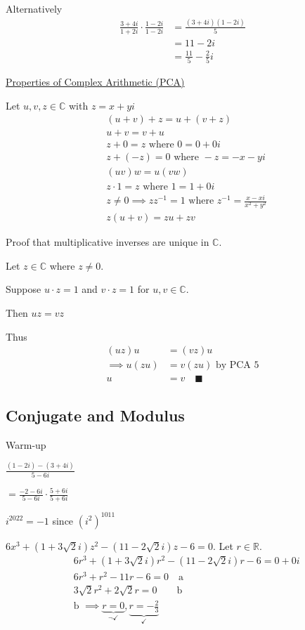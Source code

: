 \documentclass{article}
\begin{document}
Alternatively
\begin{align*}
    \frac{3+4i}{1+2i} \cdot \frac{1-2i}{1-2i} &= \frac{(3+4i)(1-2i)}{5}\\
    &= 11 - 2i\\
    &= \frac{11}{5} - \frac{2}{5}i
\end{align*}

\underline{Properties of Complex Arithmetic (PCA)}

Let $u,v,z \in \mathbb{C}$ with $z = x + yi$
\begin{align*}
    &(u + v) + z = u + (v + z)\\
    &u + v = v + u\\
    &z + 0 = z \text{ where } 0 = 0 + 0i\\
    &z + (-z) = 0 \text{ where } -z = -x - yi\\
    &(uv)w = u(vw)\\
    &z \cdot 1 = z \text{ where } 1 = 1 + 0i\\
    &z \ne 0 \implies zz^{-1} = 1 \text{ where } z^{-1} = \frac{x-xi}{x^2 + y^2} \\
    &z(u+v) = zu + zv
\end{align*}

Proof that multiplicative inverses are unique in $\mathbb{C}$.

Let $z \in \mathbb{C}$ where $z \ne 0$.

Suppose $u \cdot z = 1$ and $v \cdot z = 1$ for $u,v \in \mathbb{C}$. 

Then $uz = vz$

Thus
\begin{align*}
    (uz)u &= (vz)u \\
    \implies u(zu) &= v(zu) \text{ by PCA 5}\\
    u &= v \quad \blacksquare
\end{align*}

\subsection{Conjugate and Modulus}

Warm-up 

$\frac{(1-2i)-(3+4i)}{5-6i}$

$=\frac{-2-6i}{5-6i} \cdot \frac{5+6i}{5+6i}$

$i^{2022} = -1$ since $(i^2)^{1011}$

$6x^3 + (1 + 3\sqrt{2}i)z^2 - (11-2\sqrt{2}i)z - 6 = 0$. Let $r \in \mathbb{R}$.
\begin{align*}
    &6r^3 + (1 + 3\sqrt{2}i)r^2 - (11 - 2\sqrt{2}i)r-6 = 0 + 0i \\
    &6r^3 + r^2 - 11r - 6 = 0 \quad \text{a}\\
    &3\sqrt{2}r^2 + 2\sqrt{2}r = 0 \quad \quad \text{b}\\
    &\text{b } \implies \underbrace{r = 0}_{\neg\checkmark}, \underbrace{r = -\frac{2}{3}}_{\checkmark}
\end{align*}
\end{document}
